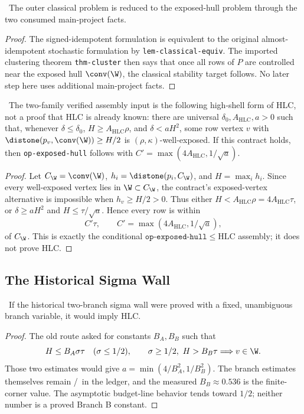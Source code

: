 \begin{proposition}
\provedbadge\  The outer classical problem is reduced to the exposed-hull
problem through the two consumed main-project facts.
\end{proposition}
\begin{proof}
The signed-idempotent formulation is equivalent to the original
almost-idempotent stochastic formulation by \texttt{lem-classical-equiv}.  The
imported clustering theorem \texttt{thm-cluster} then says that once all rows
of \(P\) are controlled near the exposed hull \(\conv(\W)\), the classical
stability target follows.  No later step here uses additional main-project
facts.
\end{proof}

\begin{proposition}
\modauditbadge\  The two-family verified assembly input is the following
high-shell form of HLC, not a proof that HLC is already known: there are
universal \(\delta_0,A_{\mathrm{HLC}},a>0\) such that, whenever
\(\delta\le\delta_0\), \(H\ge A_{\mathrm{HLC}}\rho\), and
\(\delta<aH^2\), some row vertex \(v\) with
\(\distone(p_v,\conv(\W))\ge H/2\) is \((\rho,\kappa)\)-well-exposed.
If this contract holds, then \texttt{op-exposed-hull} follows with
\(C'=\max(4A_{\mathrm{HLC}},1/\sqrt a)\).
\end{proposition}
\begin{proof}
Let \(C_{\W}=\conv(\W)\), \(h_i=\distone(p_i,C_{\W})\), and
\(H=\max_i h_i\).  Since every well-exposed vertex lies in
\(\W\subset C_{\W}\), the contract's exposed-vertex alternative is
impossible when \(h_v\ge H/2>0\).
Thus either \(H<A_{\mathrm{HLC}}\rho=4A_{\mathrm{HLC}}\tau\), or
\(\delta\geq aH^2\) and \(H\leq\tau/\sqrt a\).  Hence every row is within
\[
  C'\tau,\qquad C'=\max(4A_{\mathrm{HLC}},1/\sqrt a),
\]
of \(C_{\W}\).  This is exactly the conditional
\(\texttt{op-exposed-hull}\leq\mathrm{HLC}\) assembly; it does not prove HLC.
\end{proof}

\subsection{The Historical Sigma Wall}
\begin{proposition}
\modauditbadge\  If the historical two-branch sigma wall were proved with a
fixed, unambiguous branch variable, it would imply HLC.
\end{proposition}
\begin{proof}
The old route asked for constants \(B_A,B_B\) such that
\[
H\leq B_A\sigma\tau \quad(\sigma\leq 1/2),
\qquad
\sigma\geq1/2,\ H>B_B\tau \Longrightarrow v\in\W .
\]
Those two estimates would give \(a=\min(4/B_A^2,1/B_B^2)\).  The branch
estimates themselves remain \openbadge/\numbadge\ in the ledger, and the
measured \(B_B\approx0.536\) is the finite-corner value.  The asymptotic
budget-line behavior tends toward \(1/2\); neither number is a proved Branch B
constant.
\end{proof}

